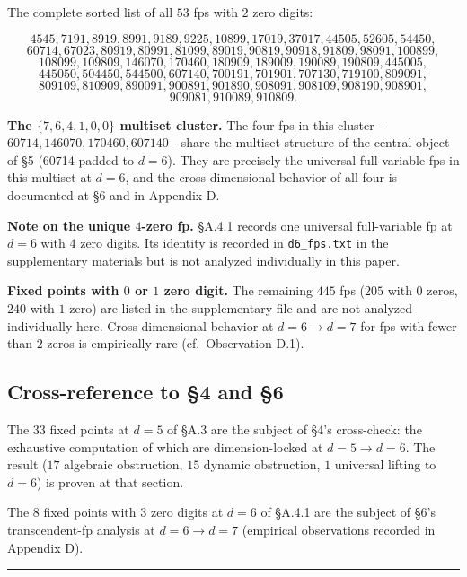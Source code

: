 \documentclass[11pt,letterpaper]{article}
\theoremstyle{paperstyle}
\theoremstyle{paperstyledef}
\theoremstyle{paperstylerem}
\begin{document}
The complete sorted list of all \(53\) fps with \(2\) zero digits:

\[4545, 7191, 8919, 8991, 9189, 9225, 10899, 17019, 37017, 44505, 52605, 54450,\]
\[60714, 67023, 80919, 80991, 81099, 89019, 90819, 90918, 91809, 98091, 100899,\]
\[108099, 109809, 146070, 170460, 180909, 189009, 190089, 190809, 445005,\]
\[445050, 504450, 544500, 607140, 700191, 701901, 707130, 719100, 809091,\]
\[809109, 810909, 890091, 900891, 901890, 908091, 908109, 908190, 908901,\]
\[909081, 910089, 910809.\]

\textbf{The \(\{7, 6, 4, 1, 0, 0\}\) multiset cluster.} The four fps in
this cluster - \(60714, 146070, 170460, 607140\) - share the
multiset structure of the central object of §5 (60714 padded to
\(d = 6\)). They are precisely the universal full-variable fps in this
multiset at \(d = 6\), and the cross-dimensional behavior of all four is
documented at §6 and in Appendix D.

\textbf{Note on the unique \(4\)-zero fp.} §A.4.1 records one universal
full-variable fp at \(d = 6\) with \(4\) zero digits. Its identity is
recorded in \texttt{d6\_fps.txt} in the supplementary materials but is
not analyzed individually in this paper.

\textbf{Fixed points with \(0\) or \(1\) zero digit.} The remaining
\(445\) fps (\(205\) with \(0\) zeros, \(240\) with \(1\) zero) are
listed in the supplementary file and are not analyzed individually here.
Cross-dimensional behavior at \(d = 6 \to d = 7\) for fps with fewer
than \(2\) zeros is empirically rare (cf.~Observation D.1).

\hypertarget{a.5-cross-reference-to-4-and-6}{%
\subsection{Cross-reference to §4 and §6}\label{a.5-cross-reference-to-4-and-6}}

The \(33\) fixed points at \(d = 5\) of §A.3 are the subject of §4's
cross-check: the exhaustive computation of which are dimension-locked at
\(d = 5 \to d = 6\). The result (\(17\) algebraic obstruction, \(15\)
dynamic obstruction, \(1\) universal lifting to \(d = 6\)) is proven at
that section.

The \(8\) fixed points with \(3\) zero digits at \(d = 6\) of §A.4.1 are
the subject of §6's transcendent-fp analysis at \(d = 6 \to d = 7\)
(empirical observations recorded in Appendix D).

\begin{center}\rule{0.5\linewidth}{0.5pt}\end{center}
\end{document}
